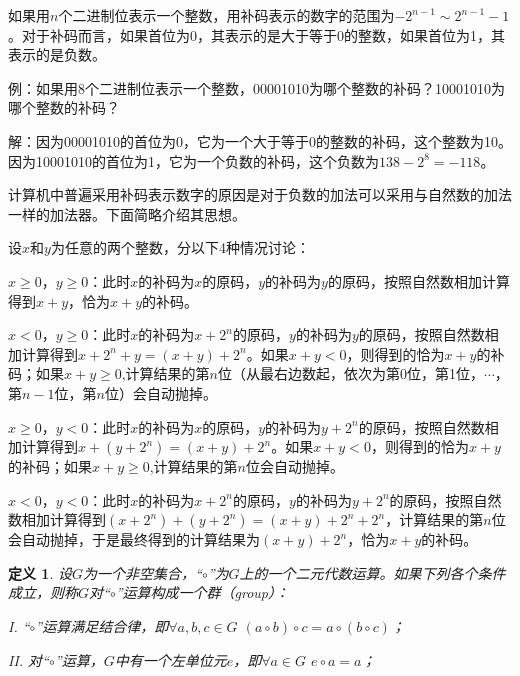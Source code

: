 \documentclass{article}
\newtheorem{Def}{定义}
\begin{document}
\begin{CJK*}{UTF8}{gbsn}
  如果用$n$个二进制位表示一个整数，用补码表示的数字的范围为$-2^{n-1}\sim 2^{n-1}-1$。对于补码而言，如果首位为0，其表示的是大于等于0的整数，如果首位为1，其表示的是负数。
  
  例：如果用8个二进制位表示一个整数，00001010为哪个整数的补码？10001010为哪个整数的补码？
  
  解：因为00001010的首位为0，它为一个大于等于0的整数的补码，这个整数为10。因为10001010的首位为1，它为一个负数的补码，这个负数为$138-2^8=-118$。
  
  计算机中普遍采用补码表示数字的原因是对于负数的加法可以采用与自然数的加法一样的加法器。下面简略介绍其思想。
  
  设$x$和$y$为任意的两个整数，分以下4种情况讨论：
  
  $x\geq 0$，$y\geq 0$：此时$x$的补码为$x$的原码，$y$的补码为$y$的原码，按照自然数相加计算得到$x+y$，恰为$x+y$的补码。
  
  $x < 0$，$y \geq 0$：此时$x$的补码为$x+2^n$的原码，$y$的补码为$y$的原码，按照自然数相加计算得到$x+2^n+y=(x+y)+2^n$。如果$x+y<0$，则得到的恰为$x+y$的补码；如果$x+y\geq0$,计算结果的第$n$位（从最右边数起，依次为第0位，第1位，$\cdots$，第$n-1$位，第$n$位）会自动抛掉。
  
  $x \geq 0$，$y < 0$：此时$x$的补码为$x$的原码，$y$的补码为$y+2^n$的原码，按照自然数相加计算得到$x+(y+2^n)=(x+y)+2^n$。如果$x+y<0$，则得到的恰为$x+y$的补码；如果$x+y\geq0$,计算结果的第$n$位会自动抛掉。
  
  $x < 0$，$y < 0$：此时$x$的补码为$x+2^n$的原码，$y$的补码为$y+2^n$的原码，按照自然数相加计算得到$(x+2^n)+(y+2^n)=(x+y)+2^n + 2^n$，计算结果的第$n$位会自动抛掉，于是最终得到的计算结果为$(x+y)+2^n$，恰为$x+y$的补码。
  
  \begin{Def}
    设$G$为一个非空集合，“$\circ$”为$G$上的一个二元代数运算。如果下列各个条件成立，则称$G$对“$\circ$”运算构成一个群（group）：
  
    I. “$\circ$”运算满足结合律，即$\forall a,b,c \in G$ $(a\circ b)\circ c = a\circ(b\circ c)$；
  
    II. 对“$\circ$”运算，$G$中有一个左单位元$e$，即$\forall a\in G$ $e\circ a = a$；
  

\end{Def}
\end{CJK*}
\end{document}
